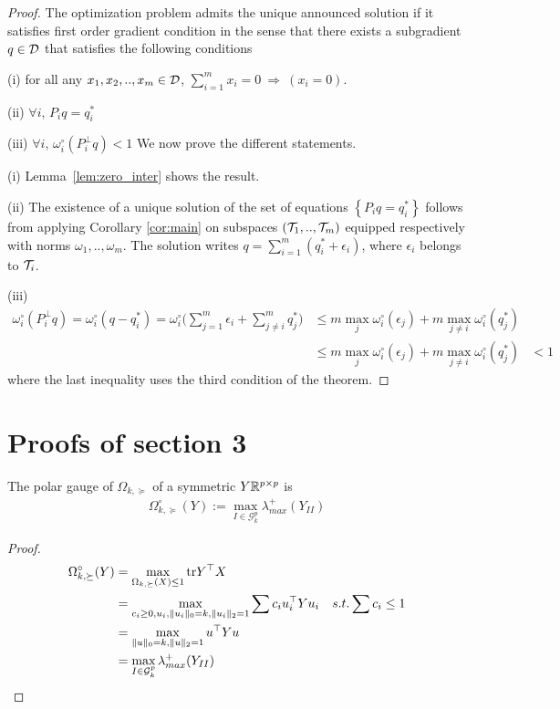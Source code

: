 \documentclass{article}
\begin{document}
\begin{proof}
 The optimization problem admits the unique announced solution if it satisfies first order gradient condition in the sense that there exists a subgradient $q \in \mathcal{D}$ that satisfies the following conditions
\BET
\item[(i)] for all any $x_{1},x_{2},..,x_{m}\in \mathcal{D}$, $\sum_{i=1}^{m} x_{i}=0 \: \Rightarrow \: (x_{i}=0)$. 
\item[(ii)] $\forall i$, $P_i q = q_i^*$
\item[(iii)]$\forall i$, $\omega_{i}^{\circ}(P_i^{\perp} q)<1$
\EET
We now prove the different statements. 
\BET
\item[(i)]  Lemma~\ref{lem:zero_inter} shows the result. 
\item[(ii)]  The existence of a unique solution of the set of equations $\left\lbrace P_i q = q_i^* \right\rbrace$ follows from applying Corollary \ref{cor:main} on subspaces $\left(\mathcal{T}_1,..,\mathcal{T}_m\right)$ equipped respectively with norms $\omega_1,.., \omega_m$. The solution writes $q=\sum_{i=1}^m(q_i^*+\epsilon_i)$, where $\epsilon_i$ belongs to $\mathcal{T}_i$.
\item[(iii)]  
\begin{align*}
\omega_{i}^{\circ}(P_i^{\perp} q) = \omega_{i}^{\circ}(q-q_i^*) = \omega_{i}^{\circ}\big(\sum_{j=1}^m\epsilon_i + \sum_{j\neq i}^m q_j^*\big) 
&\leq m \max_j \omega_{i}^{\circ}(\epsilon_j) + m  \max_{j\neq i} \omega_{i}^{\circ}(q_j^*) \\
&\leq m \max_j \omega_{i}^{\circ}(\epsilon_j) + m  \max_{j\neq i} \omega_{i}^{\circ}(q_j^*)
& < 1 
\end{align*}
where the last inequality uses the third condition of the theorem.
\EET
\end{proof}

\newpage
\section{Proofs of section 3}

\begin{lemma} The polar gauge of $\Omega_{k,\succeq}$ of a symmetric $Y\mathbb{R}^{p\times p}$ is
\begin{align}
\Omega_{k,\succeq}^{\circ}(Y):= \max_{I\in\mathcal{G}^p_k}\lambda^{+}_{max}(Y_{II})
\end{align}
\end{lemma}

\begin{proof}
\begin{align}
\Omega_{k,\succeq}^{\circ}(Y) 
&=\max_{\Omega_{k,\succeq}(X)\leq 1} {\rm tr}{Y^{\top}X}\\
&=\max_{c_i\geq 0, u_{i}, \|u_{i}\|_0=k, \|u_{i}\|_ 2=1 } \sum c_i u_{i}^{\top}Yu_{i} \quad s.t.  \sum c_i\leq 1\\
&=\max_{\|u\|_0=k, \|u\|_ 2=1 } u^{\top}Yu \\
&=\max_{I\in\mathcal{G}^p_k}\lambda^{+}_{max}(Y_{II})
\end{align}
\end{proof}
\end{document}
